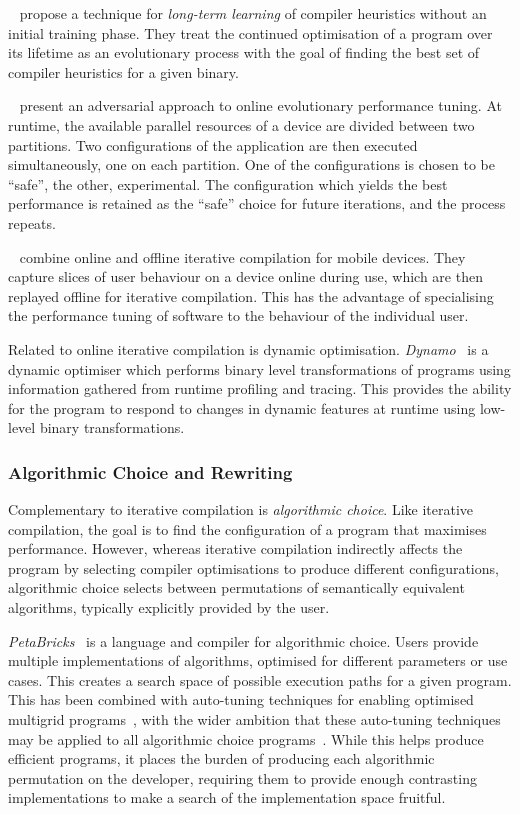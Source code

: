 \citeauthor{Tartara2013}~\cite{Tartara2013} propose a technique for \emph{long-term learning} of compiler heuristics without an initial training phase. They treat the continued optimisation of a program over its lifetime as an evolutionary process with the goal of finding the best set of compiler heuristics for a given binary.

\citeauthor{Ansel2012}~\cite{Ansel2012} present an adversarial approach to online evolutionary performance tuning. At runtime, the available parallel resources of a device are divided between two partitions. Two configurations of the application are then executed simultaneously, one on each partition. One of the configurations is chosen to be ``safe'', the other, experimental. The configuration which yields the best performance is retained as the ``safe'' choice for future iterations, and the process repeats.

\citeauthor{Mpeis2015}~\cite{Mpeis2015} combine online and offline iterative compilation for mobile devices. They capture slices of user behaviour on a device online during use, which are then replayed offline for iterative compilation. This has the advantage of specialising the performance tuning of software to the behaviour of the individual user.

Related to online iterative compilation is dynamic optimisation. \emph{Dynamo}~\cite{Bala2000} is a dynamic optimiser which performs binary level transformations of programs using information gathered from runtime profiling and tracing. This provides the ability for the program to respond to changes in dynamic features at runtime using low-level binary transformations.


\subsubsection{Algorithmic Choice and Rewriting}

Complementary to iterative compilation is \emph{algorithmic choice}. Like iterative compilation, the goal is to find the configuration of a program that maximises performance. However, whereas iterative compilation indirectly affects the program by selecting compiler optimisations to produce different configurations, algorithmic choice selects between permutations of semantically equivalent algorithms, typically explicitly provided by the user.

\emph{PetaBricks}~\cite{Ansel2009a} is a language and compiler for algorithmic choice. Users provide multiple implementations of algorithms, optimised for different parameters or use cases. This creates a search space of possible execution paths for a given program. This has been combined with auto-tuning techniques for enabling optimised multigrid programs~\cite{Chan2009}, with the wider ambition that these auto-tuning techniques may be applied to all algorithmic choice programs~\cite{Ansel2014}. While this helps produce efficient programs, it places the burden of producing each algorithmic permutation on the developer, requiring them to provide enough contrasting implementations to make a search of the implementation space fruitful.

